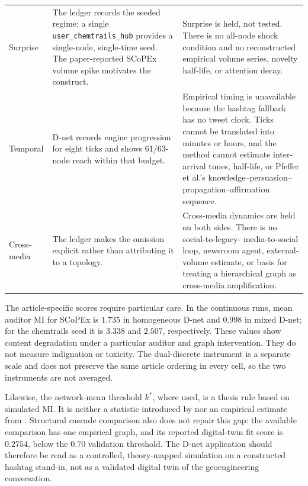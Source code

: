 \begin{table}[t]
\begin{tabular}{p{}p{}p{}}
Surprise
& The ledger records the seeded regime: a single
  \texttt{user\_chemtrails\_hub} provides a single-node, single-time seed.  The
  paper-reported SCoPEx volume spike motivates the construct.
& Surprise is held, not tested.  There is no all-node shock condition and no
  reconstructed empirical volume series, novelty half-life, or attention
  decay. \\

Temporal
& D-net records engine progression for eight ticks and shows 61/63-node
  reach within that budget.
& Empirical timing is unavailable because the hashtag fallback has no tweet
  clock.  Ticks cannot be translated into minutes or hours, and the method
  cannot estimate inter-arrival times, half-life, or Pfeffer et al.'s
  knowledge--persuasion--propagation--affirmation sequence. \\

Cross-media
& The ledger makes the omission explicit rather than attributing it to a
  topology.
& Cross-media dynamics are held on both sides.  There is no social-to-legacy-
  media-to-social loop, newsroom agent, external-volume estimate, or basis
  for treating a hierarchical graph as cross-media amplification. \\
\bottomrule
\end{tabular}
\end{table}

The article-specific scores require particular care.  In the continuous runs, mean
auditor \(\mathrm{MI}\) for SCoPEx is \(1.735\) in homogeneous D-net and
\(0.998\) in mixed D-net; for the chemtrails seed it is \(3.338\) and
\(2.507\), respectively.  These values show content degradation under a
particular auditor and graph intervention.  They do not measure indignation
or toxicity.  The dual-discrete instrument is a separate scale and does not
preserve the same article ordering in every cell, so the two instruments are
not averaged.

Likewise, the network-mean threshold \(k^*\), where used, is a thesis rule
based on simulated \(\mathrm{MI}\).  It is neither a statistic introduced by
\textcite{pfeffer2014firestorms} nor an empirical estimate from
\textcite{debnath2023conspiracy}.  Structural cascade comparison also does
not repair this gap: the available comparison has one empirical graph, and
its reported digital-twin fit score is \(0.2754\), below the \(0.70\)
validation threshold.  The D-net application should therefore be read as a
controlled, theory-mapped simulation on a constructed hashtag stand-in,
not as a validated digital twin of the geoengineering conversation.


